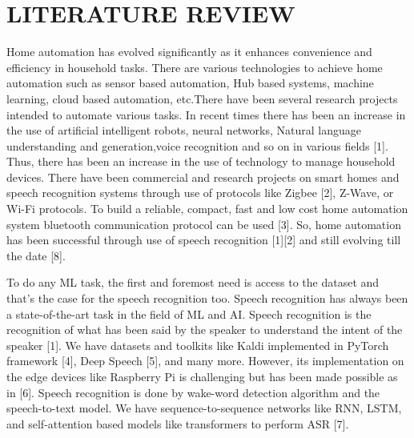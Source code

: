 \chapter{LITERATURE REVIEW}
Home automation has evolved significantly as it enhances convenience and efficiency in household tasks. There are various technologies to achieve home automation such as sensor based automation, Hub based systems, machine learning, cloud based automation, etc.There have been several research projects intended to automate various tasks. In recent times there has been an increase in the use of artificial intelligent robots, neural networks, Natural language understanding and generation,voice recognition and so on in various fields [1]. Thus, there has been an increase in the use of technology to manage household devices. There have been commercial and research projects on smart homes and speech recognition systems through use of protocols like Zigbee [2], Z-Wave, or Wi-Fi protocols. To build a reliable, compact, fast and low cost home automation system bluetooth communication protocol can be used [3]. So, home automation has been successful through use of speech recognition [1][2] and still evolving till the date [8].

To do any ML task, the first and foremost need is access to the dataset and that’s the case for the speech recognition too. Speech recognition has always been a state-of-the-art task in the field of ML and AI. Speech recognition is the recognition of what has been said by the speaker to understand the intent of the speaker [1]. We have datasets and toolkits like Kaldi implemented in PyTorch framework [4], Deep Speech [5], and many more. However, its implementation on the edge devices like Raspberry Pi is challenging but has been made possible as in [6]. Speech recognition is done by wake-word detection algorithm and the speech-to-text model. We have sequence-to-sequence networks like RNN, LSTM, and self-attention based models like transformers to perform ASR [7].  

